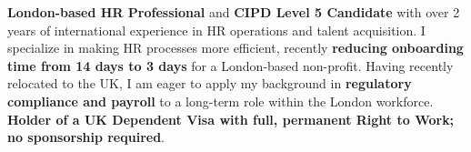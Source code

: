 
\begin{cvparagraph}
    \textbf{London-based HR Professional} and \textbf{CIPD Level 5 Candidate} with over 2 years of international experience in HR operations and talent acquisition. I specialize in making HR processes more efficient, recently \textbf{reducing onboarding time from 14 days to 3 days} for a London-based non-profit. Having recently relocated to the UK, I am eager to apply my background in \textbf{regulatory compliance and payroll} to a long-term role within the London workforce. \textbf{Holder of a UK Dependent Visa with full, permanent Right to Work; no sponsorship required}.
\end{cvparagraph}